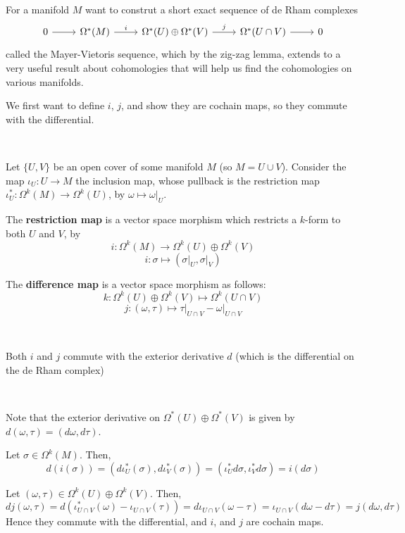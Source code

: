 \documentclass{article}
\begin{document}
\begin{remark}
\

For a manifold $M$ want to construt a short exact sequence of de Rham complexes \[\begin{tikzcd}
  0 & \Omega^*(M) & \Omega^*(U) \oplus \Omega^*(V) & \Omega^*(U \cap V) & 0
  \arrow[from=1-1, to=1-2]
  \arrow[from=1-2, to=1-3, "i"]
  \arrow[from=1-3, to=1-4, "j"]
  \arrow[from=1-4, to=1-5]
\end{tikzcd}\] called the Mayer-Vietoris sequence, which by the zig-zag lemma, extends to a very useful result about cohomologies that will help us find the cohomologies on various manifolds.

We first want to define $i$, $j$, and show they are cochain maps, so they commute with the differential.
\end{remark}

\begin{definition}
\

Let $\{U, V\}$ be an open cover of some manifold $M$ (so $M = U \cup V$). Consider the map $\iota_U: U \to M$ the inclusion map, whose pullback is the restriction map $\iota^*_U: \Omega^k(M) \to \Omega^k(U)$, by $\omega \mapsto \omega \vert_U$.

The \textbf{restriction map} is a vector space morphism which restricts a $k$-form to both $U$ and $V$, by $$i: \Omega^k(M) \to \Omega^k(U) \oplus \Omega^k(V)$$$$i: \sigma\mapsto (\sigma\vert_U,\sigma\vert_V)$$

The \textbf{difference map} is a vector space morphism as follows: $$k: \Omega^k(U) \oplus \Omega^k(V) \mapsto \Omega^k(U \cap V)$$$$j: (\omega, \tau) \mapsto \tau\vert_{U \cap V} - \omega \vert_{U \cap V}$$ 
\end{definition}

\begin{proposition}
\

Both $i$ and $j$ commute with the exterior derivative $d$ (which is the differential on the de Rham complex)
\end{proposition}

\begin{customproof}
\

Note that the exterior derivative on $\Omega^*(U) \oplus \Omega^*(V)$ is given by $d(\omega, \tau) = (d\omega, d\tau)$.

Let $\sigma \in \Omega^k(M)$. Then, $$d(i(\sigma)) = (d\iota^*_U(\sigma), d\iota_V^*(\sigma)) = (\iota^*_U d\sigma, \iota^*_V d\sigma) = i(d\sigma)$$

Let $(\omega, \tau) \in \Omega^k(U)\oplus \Omega^k(V)$. Then, $$dj(\omega, \tau) = d(\iota_{U\cap V}^*(\omega) - \iota_{U \cap V}(\tau)) = d\iota_{U\cap V}(\omega - \tau) = \iota_{U \cap V}(d\omega - d\tau) = j(d\omega, d\tau)$$Hence they commute with the differential, and $i$, and $j$ are cochain maps.
\end{customproof}
\end{document}
